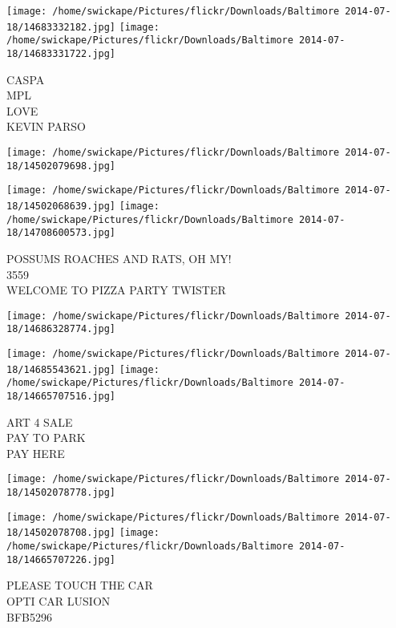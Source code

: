 \documentclass[10pt,letterpaper]{article}
\begin{document}
\texttt{[image: /home/swickape/Pictures/flickr/Downloads/Baltimore 2014-07-18/14683332182.jpg]}
\texttt{[image: /home/swickape/Pictures/flickr/Downloads/Baltimore 2014-07-18/14683331722.jpg]}

CASPA\\
MPL\\
LOVE\\
KEVIN PARSO\\
\pagebreak

\texttt{[image: /home/swickape/Pictures/flickr/Downloads/Baltimore 2014-07-18/14502079698.jpg]}

\vspace{0.25in}
\texttt{[image: /home/swickape/Pictures/flickr/Downloads/Baltimore 2014-07-18/14502068639.jpg]}
\texttt{[image: /home/swickape/Pictures/flickr/Downloads/Baltimore 2014-07-18/14708600573.jpg]}

POSSUMS ROACHES AND RATS, OH MY!\\
3559\\
WELCOME TO PIZZA PARTY TWISTER\\
\pagebreak

\texttt{[image: /home/swickape/Pictures/flickr/Downloads/Baltimore 2014-07-18/14686328774.jpg]}

\vspace{0.25in}
\texttt{[image: /home/swickape/Pictures/flickr/Downloads/Baltimore 2014-07-18/14685543621.jpg]}
\texttt{[image: /home/swickape/Pictures/flickr/Downloads/Baltimore 2014-07-18/14665707516.jpg]}

ART 4 SALE\\
PAY TO PARK\\
PAY HERE\\
\pagebreak

\texttt{[image: /home/swickape/Pictures/flickr/Downloads/Baltimore 2014-07-18/14502078778.jpg]}

\vspace{0.25in}
\texttt{[image: /home/swickape/Pictures/flickr/Downloads/Baltimore 2014-07-18/14502078708.jpg]}
\texttt{[image: /home/swickape/Pictures/flickr/Downloads/Baltimore 2014-07-18/14665707226.jpg]}

PLEASE TOUCH THE CAR\\
OPTI CAR LUSION\\
BFB5296\\
\pagebreak
\end{document}
